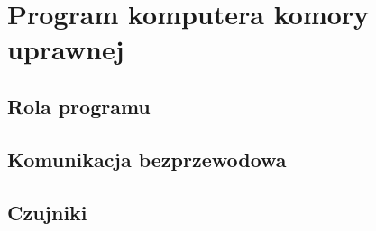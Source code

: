\chapter{Program komputera komory uprawnej}

\section{Rola programu}

\section{Komunikacja bezprzewodowa}

\section{Czujniki}
